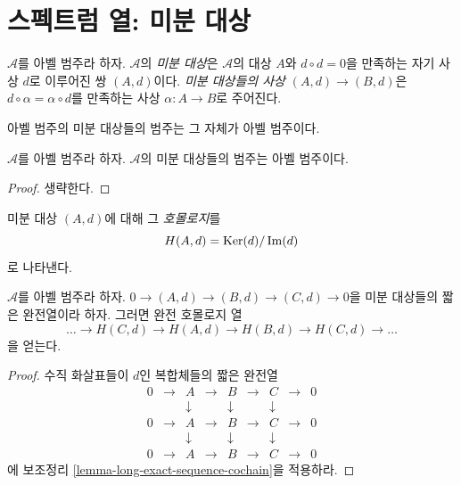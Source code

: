 \section{스펙트럼 열: 미분 대상}
\label{section-differential-object}

\begin{definition}
\label{definition-differential-object}
$\mathcal{A}$를 아벨 범주라 하자. $\mathcal{A}$의 {\it 미분 대상}은
$\mathcal{A}$의 대상 $A$와 $d \circ d = 0$을 만족하는 자기 사상 $d$로
이루어진 쌍 $(A, d)$이다. {\it 미분 대상들의 사상}
$(A, d) \to (B, d)$은 $d \circ \alpha = \alpha \circ d$를 만족하는
사상 $\alpha : A \to B$로 주어진다.
\end{definition}

\begin{lemma}
\label{lemma-differential-objects-abelian}
\begin{slogan}
아벨 범주의 미분 대상들의 범주는 그 자체가 아벨 범주이다.
\end{slogan}
$\mathcal{A}$를 아벨 범주라 하자. $\mathcal{A}$의 미분 대상들의 범주는
아벨 범주이다.
\end{lemma}

\begin{proof}
생략한다.
\end{proof}

\begin{definition}
\label{definition-differential-object-homology}
미분 대상 $(A, d)$에 대해 그 {\it 호몰로지}를
$$
H(A, d) = \mathop{\mathrm{Ker}}(d)/\mathop{\mathrm{Im}}(d)
$$
로 나타낸다.
\end{definition}

\begin{lemma}
\label{lemma-differential-objects-ses}
$\mathcal{A}$를 아벨 범주라 하자.
$0 \to (A, d) \to (B, d) \to (C, d) \to 0$을 미분 대상들의 짧은
완전열이라 하자. 그러면 완전 호몰로지 열
$$
\ldots \to H(C, d) \to H(A, d) \to H(B, d) \to H(C, d) \to \ldots
$$
을 얻는다.
\end{lemma}

\begin{proof}
수직 화살표들이 $d$인 복합체들의 짧은 완전열
$$
\begin{matrix}
0 & \to & A & \to & B & \to & C & \to & 0 \\
& & \downarrow & & \downarrow & & \downarrow \\
0 & \to & A & \to & B & \to & C & \to & 0 \\
& & \downarrow & & \downarrow & & \downarrow \\
0 & \to & A & \to & B & \to & C & \to & 0
\end{matrix}
$$
에 보조정리 \ref{lemma-long-exact-sequence-cochain}을 적용하라.
\end{proof}

